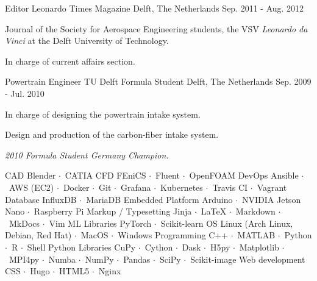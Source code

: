 \documentclass[11pt, a4paper]{preamble/awesome-cv-novo}
\newcommand{\sep}{$\cdot$~}
\begin{document}


\begin{cventries}

  \cventry
    {Editor} %
    {Leonardo Times Magazine} %
    {Delft, The Netherlands} %
    {Sep. 2011 - Aug. 2012} %
    {
      \begin{cvitems} %
        \item {Journal of the Society for Aerospace Engineering students, the VSV \textit{Leonardo da Vinci} at the Delft University of Technology.}
        \item {In charge of current affairs section.}
      \end{cvitems}
    }

  \cventry
    {Powertrain Engineer}
    {TU Delft Formula Student}
    {Delft, The Netherlands}
    {Sep. 2009 - Jul. 2010}
    {
      \begin{cvitems}
        \item {In charge of designing the powertrain intake system.}
        \item {Design and production of the carbon-fiber intake system.}
        \item {\textit{2010 Formula Student Germany Champion.}}
      \end{cvitems}
    }

\end{cventries}




\begin{cvskills}
  \cvskill
    {CAD}
    {Blender \sep CATIA}
  \cvskill
    {CFD}
    {FEniCS \sep Fluent \sep OpenFOAM}
  \cvskill
    {DevOps}
    {Ansible \sep AWS (EC2) \sep Docker \sep Git \sep Grafana \sep Kubernetes \sep Travis CI \sep Vagrant}
  \cvskill
    {Database}
    {InfluxDB \sep MariaDB}
  \cvskill
    {Embedded Platform}
    {Arduino \sep NVIDIA Jetson Nano \sep Raspberry Pi}
  \cvskill
    {Markup / Typesetting}
    {Jinja \sep LaTeX \sep Markdown \sep MkDocs \sep Vim}
  \cvskill
    {ML Libraries}
    {PyTorch \sep Scikit-learn}
  \cvskill
    {OS}
    {Linux (Arch Linux, Debian, Red Hat) \sep MacOS \sep Windows}
  \cvskill
    {Programming}
    {C++ \sep MATLAB \sep Python \sep R \sep Shell}
  \cvskill
    {Python Libraries}
    {CuPy \sep Cython \sep Dask \sep H5py \sep Matplotlib \sep MPI4py \sep Numba \sep NumPy \sep Pandas \sep SciPy \sep Scikit-image}
  \cvskill
    {Web development} %
    {CSS \sep Hugo \sep HTML5 \sep Nginx}
\end{cvskills}
\end{document}
